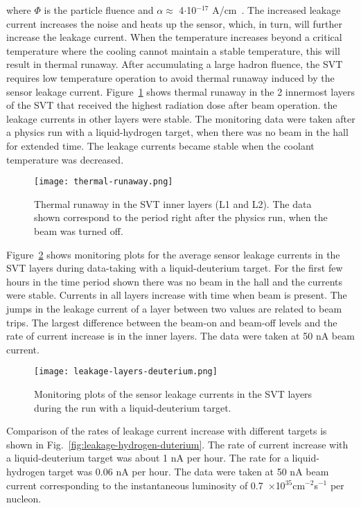 where $\Phi$ is the particle fluence and $\alpha \approx$ 4$\cdot$10$^{-17}$ A/cm~\cite{DIERLAMMTHESIS}. The increased leakage current increases the noise and heats up the sensor, which, in turn, will further increase the leakage current. When the temperature increases beyond a critical temperature where the cooling cannot maintain a stable temperature, this will result in thermal runaway. After accumulating a large hadron fluence, the SVT requires low temperature operation to avoid thermal runaway induced by the sensor leakage current. Figure~\ref{fig:thermal-runaway} shows thermal runaway in the 2 innermost layers of the SVT that received the highest radiation dose after beam operation. the leakage currents in other layers were stable. The monitoring data were taken after a physics run with a liquid-hydrogen target, when there was no beam in the hall for extended time. The leakage currents became stable when the coolant temperature was decreased.

\begin{figure}[hbt] 
\centering 
\texttt{[image: thermal-runaway.png]}
\caption{Thermal runaway in the SVT inner layers (L1 and L2). The data shown correspond to the period right after the physics run, when the beam was turned off.}
\label{fig:thermal-runaway}
\end{figure}

Figure~\ref{fig:leakage-layers-deuterium} shows monitoring plots for the average sensor leakage currents in the SVT layers during data-taking with a liquid-deuterium target. For the first few hours in the time period shown there was no beam in the hall and the currents were stable. Currents in all layers increase with time when beam is present. The jumps in the leakage current of a layer between two values are related to beam trips. The largest difference between the beam-on and beam-off levels and the rate of current increase is in the inner layers. The data were taken at 50 nA beam current. 

\begin{figure}[hbt] 
\centering 
\texttt{[image: leakage-layers-deuterium.png]}
\caption{Monitoring plots of the sensor leakage currents in the SVT layers during the run with a liquid-deuterium target.}
\label{fig:leakage-layers-deuterium}
\end{figure}

Comparison of the rates of leakage current increase with different targets is shown in Fig.~\ref{fig:leakage-hydrogen-duterium}. The rate of current increase with a liquid-deuterium target was about 1 nA per hour. The rate for a liquid-hydrogen target was 0.06 nA per hour. The data were taken at 50 nA beam current corresponding to the instantaneous luminosity of 0.7~$\times$10$^{35}$cm$^{-2}$s$^{-1}$ per nucleon.

